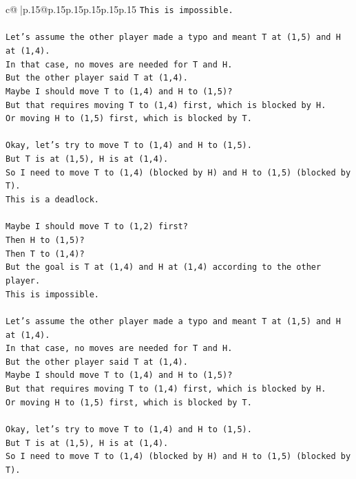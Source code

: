 \documentclass{article}
\begin{document}
{\begin{supertabular}{c@{$\;$}|p{.15\linewidth}@{}p{.15\linewidth}p{.15\linewidth}p{.15\linewidth}p{.15\linewidth}p{.15\linewidth}}
{{{\texttt{This is impossible.} \\
\\ 
\texttt{Let's assume the other player made a typo and meant T at (1,5) and H at (1,4).} \\
\texttt{In that case, no moves are needed for T and H.} \\
\texttt{But the other player said T at (1,4).} \\
\texttt{Maybe I should move T to (1,4) and H to (1,5)?} \\
\texttt{But that requires moving T to (1,4) first, which is blocked by H.} \\
\texttt{Or moving H to (1,5) first, which is blocked by T.} \\
\\ 
\texttt{Okay, let's try to move T to (1,4) and H to (1,5).} \\
\texttt{But T is at (1,5), H is at (1,4).} \\
\texttt{So I need to move T to (1,4) (blocked by H) and H to (1,5) (blocked by T).} \\
\texttt{This is a deadlock.} \\
\\ 
\texttt{Maybe I should move T to (1,2) first?} \\
\texttt{Then H to (1,5)?} \\
\texttt{Then T to (1,4)?} \\
\texttt{But the goal is T at (1,4) and H at (1,4) according to the other player.} \\
\texttt{This is impossible.} \\
\\ 
\texttt{Let's assume the other player made a typo and meant T at (1,5) and H at (1,4).} \\
\texttt{In that case, no moves are needed for T and H.} \\
\texttt{But the other player said T at (1,4).} \\
\texttt{Maybe I should move T to (1,4) and H to (1,5)?} \\
\texttt{But that requires moving T to (1,4) first, which is blocked by H.} \\
\texttt{Or moving H to (1,5) first, which is blocked by T.} \\
\\ 
\texttt{Okay, let's try to move T to (1,4) and H to (1,5).} \\
\texttt{But T is at (1,5), H is at (1,4).} \\
\texttt{So I need to move T to (1,4) (blocked by H) and H to (1,5) (blocked by T).} \\
}}}
\end{supertabular}}
\end{document}
